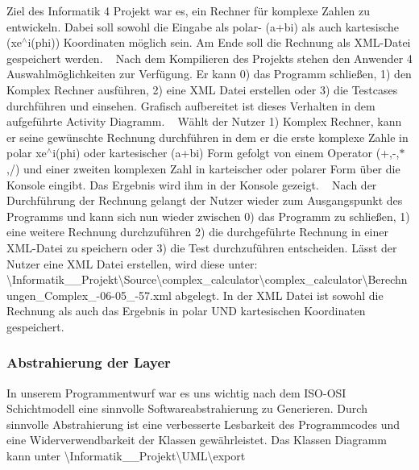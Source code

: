 Ziel des Informatik 4 Projekt war es, ein Rechner für komplexe Zahlen zu entwickeln. Dabei soll sowohl die Eingabe als polar-\/ (a+bi) als auch kartesische (xe$^\wedge$i(phi)) Koordinaten möglich sein. Am Ende soll die Rechnung als X\+M\+L-\/\+Datei gespeichert werden. ~\newline
 Nach dem Kompilieren des Projekts stehen den Anwender 4 Auswahlmöglichkeiten zur Verfügung. Er kann 0) das Programm schließen, 1) den Komplex Rechner ausführen, 2) eine X\+ML Datei erstellen oder 3) die Testcases durchführen und einsehen. Grafisch aufbereitet ist dieses Verhalten in dem aufgeführte Activity Diagramm. ~\newline
 Wählt der Nutzer 1) Komplex Rechner, kann er seine gewünschte Rechnung durchführen in dem er die erste komplexe Zahle in polar xe$^\wedge$i(phi) oder kartesischer (a+bi) Form gefolgt von einem Operator (+,-\/,$\ast$,/) und einer zweiten komplexen Zahl in karteischer oder polarer Form über die Konsole eingibt. Das Ergebnis wird ihm in der Konsole gezeigt. ~\newline
 Nach der Durchführung der Rechnung gelangt der Nutzer wieder zum Ausgangspunkt des Programms und kann sich nun wieder zwischen 0) das Programm zu schließen, 1) eine weitere Rechnung durchzuführen 2) die durchgeführte Rechnung in einer X\+M\+L-\/\+Datei zu speichern oder 3) die Test durchzuführen entscheiden. Lässt der Nutzer eine X\+ML Datei erstellen, wird diese unter\+: {\ttfamily \textbackslash{}Informatik\+\_\+\_\+\+Projekt\textbackslash{}Source\textbackslash{}complex\+\_\+calculator\textbackslash{}complex\+\_\+calculator\textbackslash{}Berechnungen\+\_\+\+Complex\+\_-\/06-\/05\+\_-\/57.\+xml} abgelegt. In der X\+ML Datei ist sowohl die Rechnung als auch das Ergebnis in polar U\+ND kartesischen Koordinaten gespeichert.

\subsubsection*{Abstrahierung der Layer}

In unserem Programmentwurf war es uns wichtig nach dem I\+S\+O-\/\+O\+SI Schichtmodell eine sinnvolle Softwareabstrahierung zu Generieren. Durch sinnvolle Abstrahierung ist eine verbesserte Lesbarkeit des Programmcodes und eine Widerverwendbarkeit der Klassen gewährleistet. Das Klassen Diagramm kann unter {\ttfamily \textbackslash{}Informatik\+\_\+\_\+\+Projekt\textbackslash{}U\+ML\textbackslash{}export}

